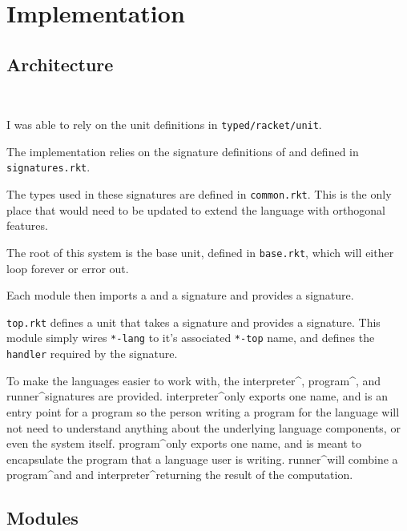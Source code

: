 
\section{Implementation}
\subsection{Architecture}
~

I was able to rely on the unit definitions in \verb#typed/racket/unit#.

The implementation relies on the signature definitions of \langSig and \topSig defined in \verb#signatures.rkt#.


The types used in these signatures are defined in \verb#common.rkt#. This is the only place that would need to be updated to extend the language with orthogonal features.

The root of this system is the base unit, defined in \verb#base.rkt#, which will either loop forever or error out.

Each module then imports a \langSig and a \topSig signature and provides a \langSig signature.

\verb#top.rkt# defines a unit that takes a \langSig signature and provides a \topSig signature. This module simply wires \verb#*-lang# to it's associated \verb#*-top# name, and defines the \verb#handler# required by the \topSig signature.


To make the languages easier to work with, the interpreter\textasciicircum, program\textasciicircum, and runner\textasciicircum signatures are provided. interpreter\textasciicircum only exports one name, and is an entry point for a program so the person writing a program for the language will not need to understand anything about the underlying language components, or even the system itself. program\textasciicircum only exports one name, and is meant to encapsulate the program that a language user is writing. runner\textasciicircum will combine a program\textasciicircum and and interpreter\textasciicircum returning the result of the computation. 
\subsection{Modules}
